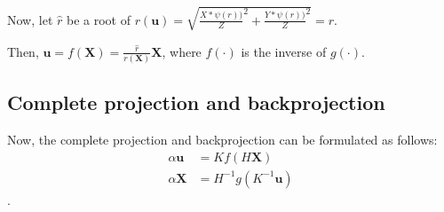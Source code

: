 Now, let \(\widehat{r}\) be a root of
\(r(\mathbf{u})
= \sqrt{
	\frac{X * \psi \left( r\right))}{Z}^{2} +
	\frac{Y * \psi \left( r\right))}{Z}^{2}
} = r\).

Then, \(\mathbf{u} = f(\mathbf{X}) =
\frac{\widehat{r}}{r(\mathbf{X})}\mathbf{X}\),
where \(f(\cdot)\) is the inverse of \(g(\cdot)\).

\subsection{Complete projection and backprojection}\label{sub:complete_projection_and_backprojection}

Now, the complete projection and backprojection can be formulated as follows:
\begin{align}
	\alpha \mathbf{u} & = K f(H\mathbf{X})
	\tag{Projection} \label{eq:projection}                     \\
	\alpha \mathbf{X} & = H^{-1} g(K^{-1}\mathbf{u}) \tag{Back
		projection} \label{eq:back_projection}
\end{align}.



